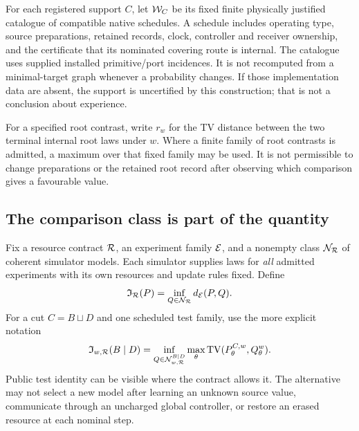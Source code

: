 For each registered support \(C\), let \(\mathcal W_C\) be its fixed finite physically justified catalogue of compatible native schedules. A schedule includes operating type, source preparations, retained records, clock, controller and receiver ownership, and the certificate that its nominated covering route is internal. The catalogue uses supplied installed primitive/port incidences. It is not recomputed from a minimal-target graph whenever a probability changes. If those implementation data are absent, the support is uncertified by this construction; that is not a conclusion about experience.

For a specified root contrast, write \(r_w\) for the TV distance between the two terminal internal root laws under \(w\). Where a finite family of root contrasts is admitted, a maximum over that fixed family may be used. It is not permissible to change preparations or the retained root record after observing which comparison gives a favourable value.

\subsection{The comparison class is part of the quantity}
Fix a resource contract \(\mathcal R\), an experiment family \(\mathcal E\), and a nonempty class \(\mathcal N_{\mathcal R}\) of coherent simulator models. Each simulator supplies laws for \emph{all} admitted experiments with its own resources and update rules fixed. Define
\begin{equation}\label{eq:cut-radius}
 \mathfrak I_{\mathcal R}(P)
 =\inf_{Q\in\mathcal N_{\mathcal R}}d_{\mathcal E}(P,Q).
\end{equation}
For a cut \(C=B\sqcup D\) and one scheduled test family, use the more explicit notation
\begin{equation}\label{eq:schedule-cut}
 \mathfrak I_{w,\mathcal R}(B\mid D)
 =\inf_{Q\in\mathcal N_{w,\mathcal R}^{B\mid D}}
 \max_\theta\operatorname{TV}(P^{C,w}_\theta,Q^w_\theta).
\end{equation}
Public test identity can be visible where the contract allows it. The alternative may not select a new model after learning an unknown source value, communicate through an uncharged global controller, or restore an erased resource at each nominal step.

